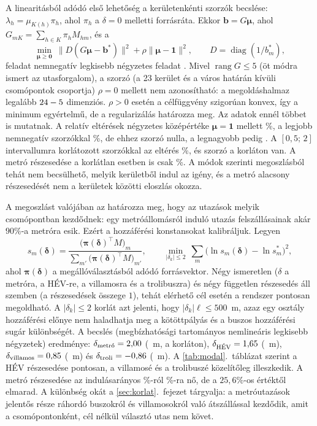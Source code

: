 \documentclass[12pt,a4paper]{article}
\theoremstyle{definition}
\theoremstyle{remark}
\begin{document}
A linearitásból adódó első lehetőség a kerületenkénti szorzók becslése: $\lambda_h=\mu_{K(h)}\pi_h$, ahol $\pi_h$ a
$\delta=0$ melletti forrásráta. Ekkor $\bm b=G\bm\mu$, ahol
$G_{mK}=\sum_{h\in K}\pi_hM_{hm}$, és a
\[
  \min_{\bm\mu\ge\bm0}\ \bigl\|D(G\bm\mu-\bm b^{*})\bigr\|^2+\rho\|\bm\mu-\bm1\|^2,
  \qquad D=\operatorname{diag}(1/b^{*}_m),
\]
feladat nemnegatív legkisebb négyzetes feladat \citep{lawson1974}. Mivel
$\operatorname{rang}G\le5$ (öt módra ismert az utasforgalom), a
\NNLSGROUPS{} szorzó (a 23 kerület és a város határán kívüli csomópontok
csoportja) $\rho=0$ mellett nem azonosítható: a megoldáshalmaz legalább
$24-5$ dimenziós. $\rho>0$ esetén a célfüggvény szigorúan konvex,
így a minimum egyértelmű, de a regularizálás határozza meg. Az adatok
ennél többet is mutatnak. A relatív eltérések négyzetes középértéke
$\bm\mu=\bm1$ mellett \NNLSRMSPRIOR\%, a legjobb nemnegatív szorzókkal
\NNLSRMSFREE\%, de ehhez \NNLSZERO{} szorzó nulla, a legnagyobb pedig
\NNLSMAX. A $[0{,}5;\,2]$ intervallumra korlátozott szorzókkal
\citep{stark1995} az eltérés \NNLSRMSBOX\%, és \NNLSBOXB{} szorzó a
korláton van. A metró részesedése a korlátlan esetben is csak \NNLSMETRO\%.
A módok szerinti megoszlásból tehát nem becsülhető, melyik kerületből indul
az igény, és a metró alacsony részesedését nem a kerületek közötti eloszlás
okozza.

A megoszlást valójában az határozza meg, hogy az utazások melyik
csomópontban kezdődnek: egy metróállomásról induló utazás felszállásainak
akár $90\%$-a metróra esik. Ezért a hozzáférési konstansokat kalibráljuk.
Legyen
\[
  s_m(\bm\delta)=\frac{\bigl(\bm\pi(\bm\delta)^{\top}M\bigr)_m}{\sum_{m'}\bigl(\bm\pi(\bm\delta)^{\top}M\bigr)_{m'}},
  \qquad
  \min_{|\delta_k|\le2}\ \sum_m\bigl(\ln s_m(\bm\delta)-\ln s^{*}_m\bigr)^2 ,
\]
ahol $\bm\pi(\bm\delta)$ a megállóválasztásból adódó forrásvektor. Négy
ismeretlen ($\delta$ a metróra, a HÉV-re, a villamosra és a trolibuszra) és
négy független részesedés áll szemben (a részesedések összege $1$), tehát
elérhető cél esetén a rendszer pontosan megoldható. A $|\delta_k|\le2$
korlát azt jelenti, hogy $|\delta_k|\ell\le500$~m, azaz egy osztály
hozzáférési előnye nem haladhatja meg a kötöttpályás és a buszos
hozzáférési sugár különbségét. A becslés (megbízhatósági tartományos
nemlineáris legkisebb négyzetek) eredménye: $\delta_{\text{metró}}=2{,}00$
(\DELTAMMETRO~m, a korláton), $\delta_{\text{HÉV}}=1{,}65$
(\DELTAMHEV~m), $\delta_{\mathrm{villamos}}=0{,}85$ (\DELTAMTRAM~m) és
$\delta_{\mathrm{troli}}=-0{,}86$ (\DELTAMTROLLEY~m). A
\ref{tab:modal}.~táblázat szerint a HÉV részesedése pontosan, a villamosé és
a trolibuszé közelítőleg illeszkedik. A metró részesedése az indulásarányos
\DEPMSMETRO\%-ról \MSBMETRO\%-ra nő, de a $25{,}6\%$-os értéktől elmarad.
A különbség okát a \ref{sec:korlat}.~fejezet tárgyalja: a metróutazások
jelentős része ráhordó buszokról és villamosokról való átszállással kezdődik,
amit a csomópontonként, cél nélkül választó utas nem követ.
\end{document}
